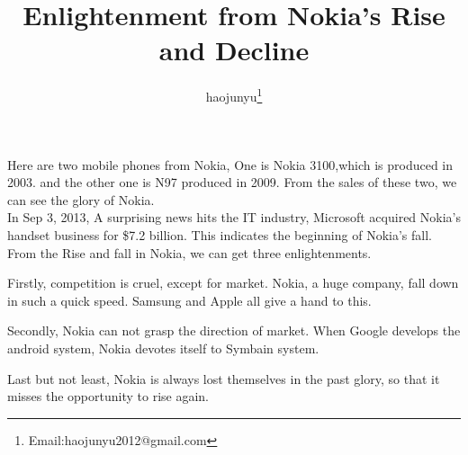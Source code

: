 \documentclass[12pt,a4paper]{article}
\begin{document}
\large
\pagestyle{fancy} 
\lhead{}
\rhead{}
\title{Enlightenment from Nokia's Rise and Decline}	   		%
\author{haojunyu\thanks{Email:haojunyu2012@gmail.com}}	%
\maketitle 											%
\thispagestyle{fancy}    							%
Here are two mobile phones from Nokia, One is Nokia 3100,which is produced
in 2003. and the other one is N97 produced in 2009. From the sales of these
two, we can see the glory of Nokia.\\


In Sep 3, 2013, A surprising news hits the IT industry, Microsoft acquired Nokia's handset business for \${}7.2 billion. This indicates the beginning of Nokia's fall.\\


From the Rise and fall in Nokia, we can get three enlightenments.

 Firstly, competition is cruel, except for market. Nokia, a huge company, fall down in such a  quick speed. Samsung and Apple all give a hand to this. 
 
 
Secondly, Nokia can not grasp the direction of market. When Google develops the android system, Nokia devotes 
itself to Symbain system. 


Last but not least, Nokia is always lost themselves in the past glory, so that it misses the opportunity to rise again.

 


























\clearpage     
\end{document}
